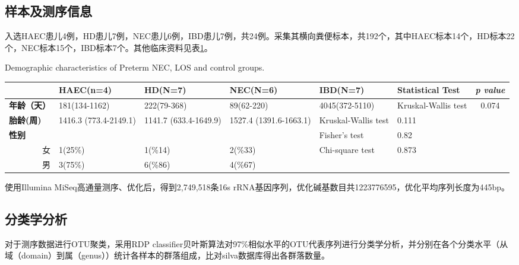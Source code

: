   \subsection{样本及测序信息}
  入选HAEC患儿4例，HD患儿7例，NEC患儿6例，IBD患儿7例，共24例。采集其横向粪便标本，共192个，其中HAEC标本14个，HD标本22个，NEC标本15个，IBD标本7个。其他临床资料见表\ref{tab:comparedemographic}。

  \begin{table}[!hpb]
    \centering
      {Demographic characteristics of Preterm NEC, LOS and control groups.}
    \label{tab:comparedemographic}
    \begin{tabular}{lp{1.8cm}p{1.8cm}p{1.8cm}p{1.8cm}p{2cm}c}
      \toprule
         & \textbf{HAEC(n=4)} & \textbf{HD(N=7)} & \textbf{NEC(N=6)} & \textbf{IBD(N=7)} & \textbf{Statistical Test} & \textit{p value} \\ \midrule
        \textbf{年龄（天）} & 181(134-1162) & 222(79-368) & 89(62-220) & 4045(372-5110) & Kruskal-Wallis test & 0.074 \\
        \textbf{胎龄(周)} & 1416.3 (773.4-2149.1) & 1141.7 (633.4-1649.9) & 1527.4 (1391.6-1663.1) & Kruskal-Wallis test & 0.111 \\
        \textbf{性别} &  &  &  & Fisher's test & 0.82 \\
        \multicolumn{1}{r}{女} & 1(25\%) & 1(\%14) & 2(\%33) & Chi-square test & 0.873\\
        \multicolumn{1}{r}{男} & 3(75\%) & 6(\%86) & 4(\%67) &  & \\
         \bottomrule
    \end{tabular}
  \end{table}


  使用Illumina MiSeq高通量测序、优化后，得到2,749,518条16s rRNA基因序列，优化碱基数目共1223776595，优化平均序列长度为445bp。

  \subsection{分类学分析}
  对于测序数据进行OTU聚类，采用RDP classifier贝叶斯算法对97\%相似水平的OTU代表序列进行分类学分析，并分别在各个分类水平（从域（domain）到属（genus））统计各样本的群落组成，比对silva数据库得出各群落数量。
